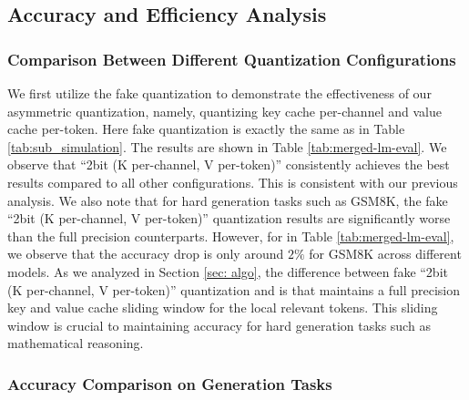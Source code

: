 \subsection{Accuracy and Efficiency Analysis}

\subsubsection{Comparison Between Different Quantization Configurations}

We first utilize the fake quantization to demonstrate the effectiveness of our asymmetric quantization, namely, quantizing key cache per-channel and value cache per-token. 
Here fake quantization is exactly the same as in Table \ref{tab:sub_simulation}.
The results are shown in Table \ref{tab:merged-lm-eval}.
We observe that ``2bit (K per-channel, V per-token)'' consistently achieves the best results compared to all other configurations.
This is consistent with our previous analysis.
We also note that for hard generation tasks such as GSM8K, the fake ``2bit (K per-channel, V per-token)'' quantization results are significantly worse than the full precision counterparts.
However, for \kivi{} in Table \ref{tab:merged-lm-eval}, we observe that the accuracy drop is only around $2\%$ for GSM8K across different models.
As we analyzed in Section \ref{sec: algo},
the difference between fake ``2bit (K per-channel, V per-token)'' quantization and \kivi{} is that \kivi{} maintains a full precision key and value cache sliding window for the local relevant tokens.
This sliding window is crucial to maintaining accuracy for hard generation tasks such as mathematical reasoning. 

\subsubsection{Accuracy Comparison on Generation Tasks}





